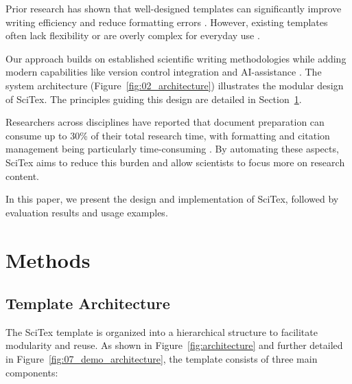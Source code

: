 \documentclass[preprint,review,12pt]{elsarticle}\n
\begin{document}
Prior research has shown that well-designed templates can significantly improve writing efficiency and reduce formatting errors \cite{Williams2021}. However, existing templates often lack flexibility or are overly complex for everyday use \cite{Garcia2019}.

Our approach builds on established scientific writing methodologies while adding modern capabilities like version control integration and AI-assistance \cite{Taylor2022}. The system architecture (Figure~\ref{fig:02_architecture}) illustrates the modular design of SciTex. The principles guiding this design are detailed in Section~\ref{sec:methods}.


Researchers across disciplines have reported that document preparation can consume up to 30\% of their total research time, with formatting and citation management being particularly time-consuming \cite{Lee2018}. By automating these aspects, SciTex aims to reduce this burden and allow scientists to focus more on research content.

In this paper, we present the design and implementation of SciTex, followed by evaluation results and usage examples.



\section{Methods}
\label{sec:methods}


\subsection{Template Architecture}
\label{subsec:architecture}

The SciTex template is organized into a hierarchical structure to facilitate modularity and reuse. As shown in Figure~\ref{fig:architecture} and further detailed in Figure~\ref{fig:07_demo_architecture}, the template consists of three main components:
\end{document}

